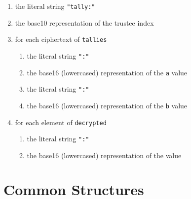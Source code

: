 \begin{enumerate}
    \item the literal string \lstinline[style=ES6]{"tally:"}
    \item the base10 representation of the trustee index
    \item for each ciphertext of \texttt{tallies}
          \begin{enumerate}
              \item the literal string \lstinline[style=ES6]{":"}
              \item the base16 (lowercased) representation of the \texttt{a} value
              \item the literal string \lstinline[style=ES6]{":"}
              \item the base16 (lowercased) representation of the \texttt{b} value
          \end{enumerate}
    \item for each element of \texttt{decrypted}
          \begin{enumerate}
              \item the literal string \lstinline[style=ES6]{":"}
              \item the base16 (lowercased) representation of the value
          \end{enumerate}
\end{enumerate}

\section*{Common Structures}


